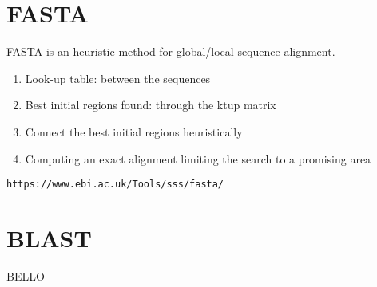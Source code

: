 \documentclass[11pt]{article}
\begin{document}
\section{FASTA} %
\label{sec:fasta}
FASTA is an heuristic method for global/local sequence alignment.
\begin{enumerate}
	\item Look-up table: between the sequences
	\item Best initial regions found: through the ktup matrix
	\item Connect the best initial regions heuristically 
	\item Computing an exact alignment limiting the search to a promising area
\end{enumerate}
\texttt{https://www.ebi.ac.uk/Tools/sss/fasta/}
\section{BLAST} %
\label{sec:blast}  
BELLO
\end{document}
